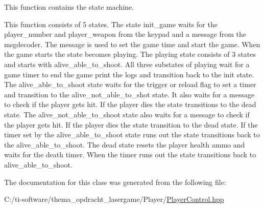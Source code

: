 This function contains the state machine. 

This function consists of 5 states. The state init\+\_\+game waits for the player\+\_\+number and player\+\_\+weapon from the keypad and a message from the msgdecoder. The message is used to set the game time and start the game. When the game starts the state becomes playing. The playing state consists of 3 states and starts with alive\+\_\+able\+\_\+to\+\_\+shoot. All three substates of playing wait for a game timer to end the game print the logs and transition back to the init state. The alive\+\_\+able\+\_\+to\+\_\+shoot state waits for the trigger or reload flag to set a timer and transition to the alive\+\_\+not\+\_\+able\+\_\+to\+\_\+shot state. It also waits for a message to check if the player gets hit. If the player dies the state transitions to the dead state. The alive\+\_\+not\+\_\+able\+\_\+to\+\_\+shoot state also waits for a message to check if the player gets hit. If the player dies the state transition to the dead state. If the timer set by the alive\+\_\+able\+\_\+to\+\_\+shoot state runs out the state transitions back to the alive\+\_\+able\+\_\+to\+\_\+shoot. The dead state resets the player health ammo and waits for the death timer. When the timer runs out the state transitions back to alive\+\_\+able\+\_\+to\+\_\+shoot. 

The documentation for this class was generated from the following file\+:\begin{DoxyCompactItemize}
\item 
C\+:/ti-\/software/thema\+\_\+opdracht\+\_\+lasergame/\+Player/\mbox{\hyperlink{_player_control_8hpp}{Player\+Control.\+hpp}}\end{DoxyCompactItemize}
